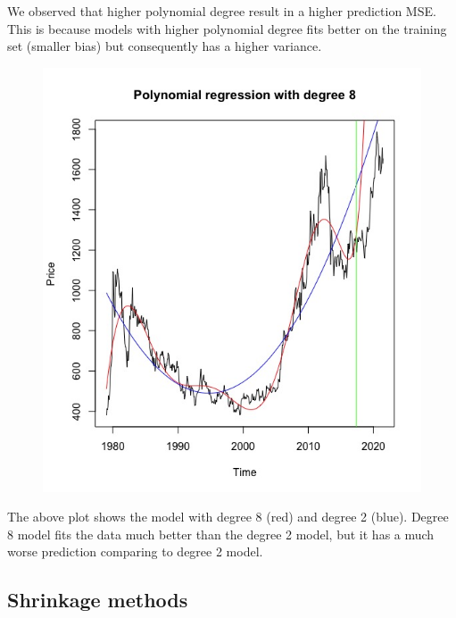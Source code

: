 \documentclass[paper=letter, fontsize=11pt]{scrartcl}
\begin{document}
We observed that higher polynomial degree result in a higher prediction MSE. This is because models with higher polynomial degree fits better on the training set (smaller bias) but consequently has a higher variance.

\begin{figure}[h]
    \centering
    \includegraphics[width=0.5\linewidth]{Image/poly-comp.jpeg}
\end{figure}

The above plot shows the model with degree 8 (red) and degree 2 (blue). Degree 8 model fits the data much better than the degree 2 model, but it has a much worse prediction comparing to degree 2 model.



\subsection{Shrinkage methods}
\label{app:shrinkage-summary}
\end{document}
